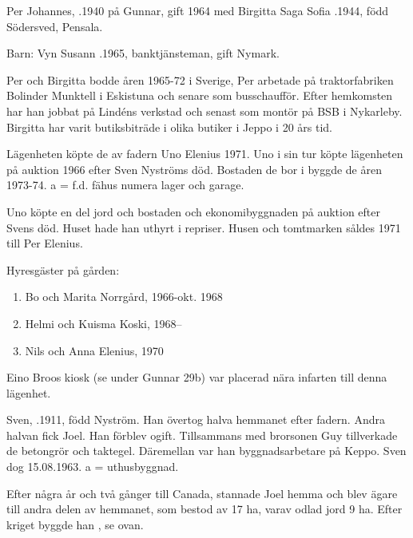 Per Johannes, .1940 på Gunnar, gift 1964 med Birgitta Saga Sofia .1944, född Södersved, Pensala.

Barn: Vyn Susann .1965, banktjänsteman, gift Nymark.

Per och Birgitta bodde åren 1965-72 i Sverige, Per arbetade på traktorfabriken Bolinder Munktell i Eskistuna och senare som busschaufför. Efter hemkomsten har han jobbat på Lindéns verkstad och senast som montör på BSB i Nykarleby. Birgitta har varit butiksbiträde i olika butiker i Jeppo i 20 års tid.

Lägenheten köpte de av fadern Uno Elenius 1971. Uno i sin tur köpte lägenheten på auktion 1966 efter Sven Nyströms död. Bostaden de bor i byggde de åren 1973-74.  a = f.d. fähus numera lager och garage.






Uno köpte en del jord och bostaden och ekonomibyggnaden på auktion efter Svens död. Huset hade han uthyrt i repriser. Husen och tomtmarken såldes 1971 till Per Elenius.

Hyresgäster på gården:
\begin{enumerate}
  \item Bo och Marita Norrgård, 1966-okt. 1968
  \item Helmi och Kuisma Koski, 1968--
  \item Nils och Anna  Elenius, 1970
\end{enumerate}
Eino Broos kiosk (se under Gunnar 29b) var placerad nära infarten till denna lägenhet.

Sven, .1911, född Nyström. Han övertog halva hemmanet efter fadern. Andra halvan fick Joel. Han förblev ogift. Tillsammans med brorsonen Guy tillverkade de betongrör och taktegel. Däremellan var han byggnadsarbetare på Keppo. Sven dog 15.08.1963. a = uthusbyggnad.\jhvspace{}


Efter några år och två gånger till Canada, stannade Joel hemma och blev ägare till andra delen av hemmanet, som bestod av 17 ha, varav odlad jord 9 ha. Efter kriget byggde han , se ovan.



